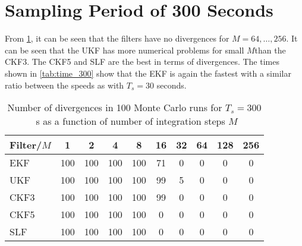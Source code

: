 \documentclass[../zhang_thesis.tex]{subfiles}
\begin{document}
%

%

\clearpage

\section{Sampling Period of 300 Seconds}

From \cref{tab:div_300}, it can be seen that the filters have no divergences for $M=64,\dots,256$. It can be seen that the UKF has more numerical problems for small $M$than the CKF3. The CKF5 and SLF are the best in terms of divergences. The times shown in \cref{tab:time_300} show that the EKF is again the fastest with a similar ratio between the speeds as with $T_s=30$ seconds. 

\begin{table}[h]
\centering
\caption{Number of divergences in 100 Monte Carlo runs for $T_s=300$~s as a function of number of integration steps $M$}
\begin{tabular}{@{}l*{9}{c}@{}}
\toprule
Filter/$M$ & 1   & 2   & 4   & 8   & 16  & 32 & 64 & 128 & 256 \\
\midrule
EKF        & 100 & 100 & 100 & 100 & 71  & 0  & 0  & 0   & 0   \\
UKF        & 100 & 100 & 100 & 100 & 99  & 5  & 0  & 0   & 0   \\
CKF3       & 100 & 100 & 100 & 100 & 99  & 0  & 0  & 0   & 0   \\
CKF5       & 100 & 100 & 100 & 100 & 0   & 0  & 0  & 0   & 0   \\
SLF        & 100 & 100 & 100 & 100 & 0   & 0  & 0  & 0   & 0   \\
\bottomrule
\end{tabular}
\label{tab:div_300}
\end{table}
\end{document}
